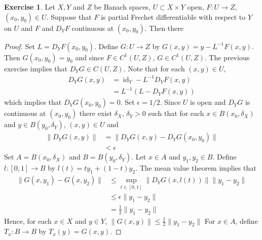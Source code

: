 \documentclass[12pt]{amsart}
\theoremstyle{definition}
\newtheorem{ex}[definition]{Exercise}
\newcommand{\del}{\delta}
\newcommand{\ep}{\epsilon}
\DeclareMathOperator{\id}{id}
\DeclareMathOperator*{\0}{\mbf{0}}
\DeclareMathOperator*{\1}{\mbf{1}}
\begin{document}
	\begin{ex}
		Let $X, Y$ and $Z$ be Banach spaces, $U \subset X \times Y$ open, $F: U \rightarrow Z$, $(x_0, y_0) \in U$. Suppose that $F$ is partial Frechet differentiable with respect to $Y$ on $U$ and $F$ and $D_YF$ continuous at $(x_0, y_0)$. Then there  
	\end{ex}

	\begin{proof}
		Set $L = D_YF(x_0, y_0)$. Define $G: U \rightarrow Z$ by $G(x,y) = y - L^{-1}F(x,y)$. Then $G(x_0, y_0) = y_0$ and since $F \in C^1(U, Z)$, $G \in C^1(U, Z)$. The previous exercise implies that $D_YG \in C(U, Z)$. Note that for each $(x,y) \in U$,
		\begin{align*}
			D_YG(x, y) 
			& = \id_Y - L^{-1} D_YF(x,y) \\
			& = L^{-1}(L - D_YF(x,y))
		\end{align*} 
		which implies that $D_YG(x_0, y_0) = 0$. Set $\ep = 1/2$. Since $U$ is open and $D_YG$ is continuous at $(x_0, y_0)$ there exist $\del_X$, $\del_Y > 0$ such that for each $x \in B(x_0, \del_X)$ and $y \in B(y_0, \del_Y)$, $(x, y) \in U$ and  
		\begin{align*}
			\|D_YG(x, y)\| 
			& =  \|D_YG(x, y) - D_YG(x_0, y_0)\| \\
			& < \ep
		\end{align*}
		Set $A = B(x_0, \del_X)$ and $B = B(y_0, \del_Y)$. Let $x \in A$ and $y_1, y_2 \in B$. Define $l: [0,1] \rightarrow B$ by $l(t) = ty_1 + (1-t)y_2$. The mean value theorem implies that 
		\begin{align*}
			\|G(x, y_1) - G(x, y_2)\| 
			& \leq \sup_{t \in [0,1]} \|D_YG(x, l(t))\|\|y_1 - y_2\| \\
			& \leq \ep \|y_1 - y_2\| \\
			& = \frac{1}{2}\|y_1 - y_2\| 
		\end{align*} 
		Hence, for each $x \in X$ and $y \in Y$, 
		$\|G(x, y)\| \leq \frac{1}{2}\|y_1 - y_2\|$  
		For $x \in A$, define $T_x: B \rightarrow B$ by $T_x(y) = G(x,y)$. 
	\end{proof}


	
	
	
	
	
	
	
	
	
	
	
	
	
	
	
	
	
	
\end{document}

